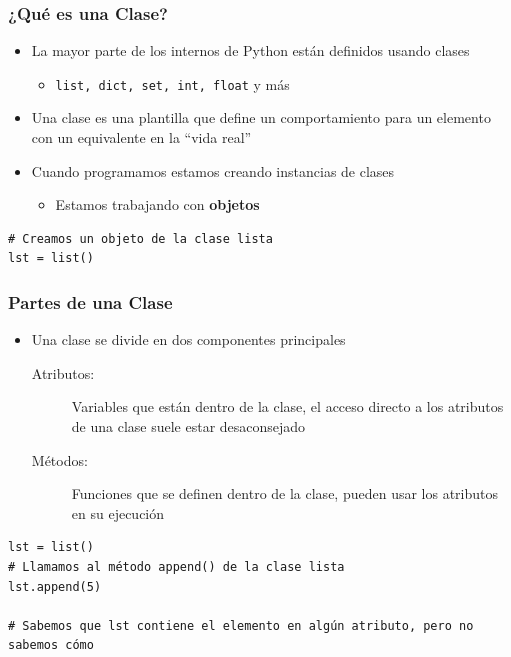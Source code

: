 \documentclass[11pt]{beamer}
\begin{document}
\begin{frame}[fragile]\frametitle{¿Qué es una Clase?}
\begin{itemize}
\item La mayor parte de los internos de Python están definidos usando clases
    \begin{itemize}
    \item \lstinline|list, dict, set, int, float| y más
    \end{itemize}
\item Una clase es una plantilla que define un comportamiento para un elemento con un equivalente en la ``vida real''
\item Cuando programamos estamos creando instancias de clases
    \begin{itemize}
    \item Estamos trabajando con \textbf{objetos}
    \end{itemize}
\end{itemize}
\begin{lstlisting}
# Creamos un objeto de la clase lista
lst = list()
\end{lstlisting}
\end{frame}

\begin{frame}[fragile]\frametitle{Partes de una Clase}
\begin{itemize}
\item Una clase se divide en dos componentes principales
\begin{description}
\item[Atributos:] Variables que están dentro de la clase, el acceso directo a los atributos de una clase suele estar desaconsejado
\item[Métodos:] Funciones que se definen dentro de la clase, pueden usar los atributos en su ejecución
\end{description}
\end{itemize}
\begin{lstlisting}
lst = list()
# Llamamos al método append() de la clase lista
lst.append(5)

# Sabemos que lst contiene el elemento en algún atributo, pero no sabemos cómo
\end{lstlisting}
\end{frame}
\end{document}
